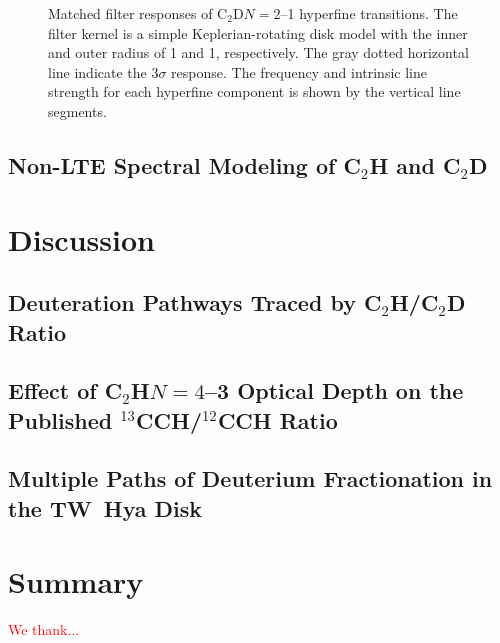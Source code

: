 \documentclass[linenumbers, twocolumn, times]{aastex631}
\newcommand{\CCH}{C$_2$H\xspace}
\newcommand{\CCD}{C$_2$D\xspace}
\begin{document}
\begin{figure}
\caption{Matched filter responses of \CCD $N=2$--1 hyperfine transitions. The filter kernel is a simple Keplerian-rotating disk model with the inner and outer radius of 1 and 1, respectively. The gray dotted horizontal line indicate the $3\sigma$ response. The frequency and intrinsic line strength for each hyperfine component is shown by the vertical line segments.}
\label{fig:abundance_comparison}
\end{figure}


\subsection{Non-LTE Spectral Modeling of \CCH and \CCD}

\section{Discussion} \label{sec:discussion}

\subsection{Deuteration Pathways Traced by \CCH/\CCD Ratio}

\subsection{Effect of \CCH $N=4$--3 Optical Depth on the Published $^{13}$CCH/$^{12}$CCH Ratio}

\subsection{Multiple Paths of Deuterium Fractionation in the TW~Hya Disk}

\section{Summary} \label{sec:summary}


\begin{acknowledgments}
\textcolor{red}{We thank...}
\end{acknowledgments}

%
\end{document}
